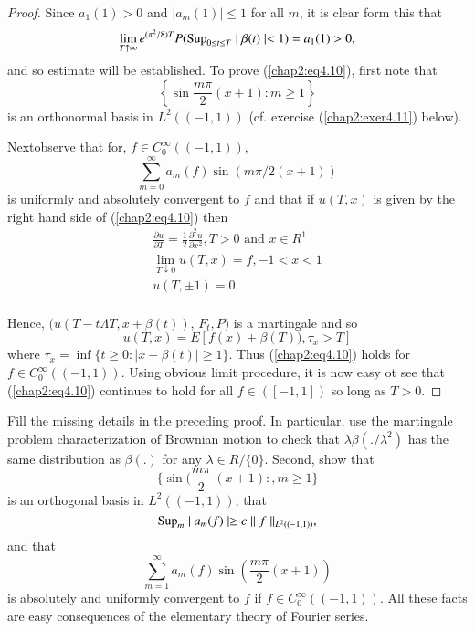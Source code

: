 \begin{proof}
Since $ a_1 (1) > 0 $ and  $ \mid a_m (1)  \mid  \leq 1 $ for all
$m$, it is clear form this that   
$$
\lim_{T \uparrow \infty} e^{( \pi^2 /8) T} P(\operatorname{Sup}_{ 0 \leq t \leq
  T} \mid \beta (t) \mid < 1) = a_1 (1) > 0,  
$$
and so estimate will be established. To prove (\ref{chap2:eq4.10}),
first note that     
$$
\left\{ \sin \frac{m \pi}{2} (x+1): m \ge 1 \right\} 
$$
is an  orthonormal basis in $ L^2(( -1, 1 ))$ (cf. exercise
(\ref{chap2:exer4.11}) below).  

Next\pageoriginale observe that for, $ f\in C^\infty_0  ( (-1, 1 ))$,
$$
\sum^{\infty}_{m =0} a_m (f) \sin ( m \pi/2 ( x+1) )
$$
 is uniformly and  absolutely convergent to  $f$  and that if $ u
 (T,x) $ is given by the right hand side of (\ref{chap2:eq4.10}) then  
 \begin{gather*}
\frac{ \partial u}{ \partial T} = \frac{1}{2} \frac{ \partial^2 u}{
  \partial x^2} , T > 0 \text{ and } x \in  R^1 \\ 
\lim_{ T \downarrow 0}  u ( T,x ) = f, -1 < x < 1 \\
u ( T, \pm 1 ) = 0. \\ 
 \end{gather*} 
 
 Hence, $( u ( T -t  \Lambda T, x + \beta ( t )) $,   $ F_t, P ) $
 is a martingale and so  
 $$
 u (T,x ) = E [ f (x)  +  \beta ( T )), \tau_x > T ]  
 $$
 where  $ \tau_x = \inf  \{ t \ge 0 :   \mid x  +  \beta ( t ) \mid
 \ge 1 \} $. Thus (\ref{chap2:eq4.10}) holds for  $ f \in C^\infty_0 (( -1, 1
 )) $. Using  obvious limit procedure, it is  now easy ot  see that 
 (\ref{chap2:eq4.10}) continues  to hold for all  $ f \in ([ -1, 1])$ so long
 as  $ T > 0 $.  
\end{proof}

\setcounter{exercise}{10}
\begin{exercise}\label{chap2:exer4.11}%
 Fill the missing details in the preceding  proof. In particular, use
 the martingale problem characterization of Brownian motion to check
 that $ \lambda \beta ( ./ \lambda^2 ) $ has the same distribution as
 $ \beta (.) $ for any $ \lambda \in R / \{ 0 \} $. Second,
 show that  
 $$
 \{ \sin ( \frac{m \pi}{2} ~ ( x+1 ) : ,m \ge  1 \} 
 $$
 is an  orthogonal basis in  $ L^2 (( -1,1 )) $, that 
 $$
\operatorname{Sup}_{m}  \mid a_m (f) \mid  \ge c \mid\mid f \mid\mid_{ L^2 (( -1,1
  ))}, 
 $$\pageoriginale
 and that 
 $$
 \sum^{\infty}_{m=1} a_m (f) \sin ( \frac{m \pi}{2} ( x + 1 ))
 $$
 is absolutely and uniformly convergent to $ f $ if  $ f \in
 C^\infty_0 ((-1,1 )) $. 
 All these facts are easy consequences of the  elementary theory of
 Fourier  series. 
 \end{exercise}
 
